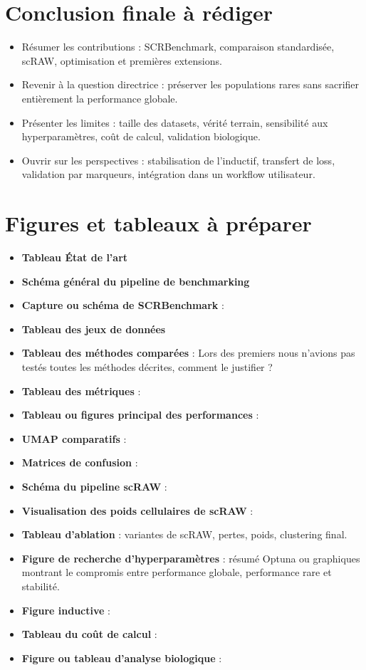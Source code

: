 \section*{Conclusion finale à rédiger}

\begin{itemize}
  \item Résumer les contributions : SCRBenchmark, comparaison standardisée, scRAW, optimisation et premières extensions.
  \item Revenir à la question directrice : préserver les populations rares sans sacrifier entièrement la performance globale.
  \item Présenter les limites : taille des datasets, vérité terrain, sensibilité aux hyperparamètres, coût de calcul, validation biologique.
  \item Ouvrir sur les perspectives : stabilisation de l'inductif, transfert de loss, validation par marqueurs, intégration dans un workflow utilisateur.
\end{itemize}

\section*{Figures et tableaux à préparer}

\begin{itemize}
  \item \textbf{Tableau État de l'art} 
  \item \textbf{Schéma général du pipeline de benchmarking} 
  \item \textbf{Capture ou schéma de SCRBenchmark} :
  \item \textbf{Tableau des jeux de données} 
  \item \textbf{Tableau des méthodes comparées} : Lors des premiers nous n'avions pas testés toutes les méthodes décrites, comment le justifier ?
  \item \textbf{Tableau des métriques} : 
  \item \textbf{Tableau ou figures principal des performances} :
  \item \textbf{UMAP comparatifs} :
  \item \textbf{Matrices de confusion} :
  \item \textbf{Schéma du pipeline scRAW} : 
  \item \textbf{Visualisation des poids cellulaires de scRAW} :
  \item \textbf{Tableau d'ablation} : variantes de scRAW, pertes, poids, clustering final.
  \item \textbf{Figure de recherche d'hyperparamètres} : résumé Optuna ou graphiques montrant le compromis entre performance globale, performance rare et stabilité.
  \item \textbf{Figure inductive} : 
  \item \textbf{Tableau du coût de calcul} : 
  \item \textbf{Figure ou tableau d'analyse biologique} :
\end{itemize}
